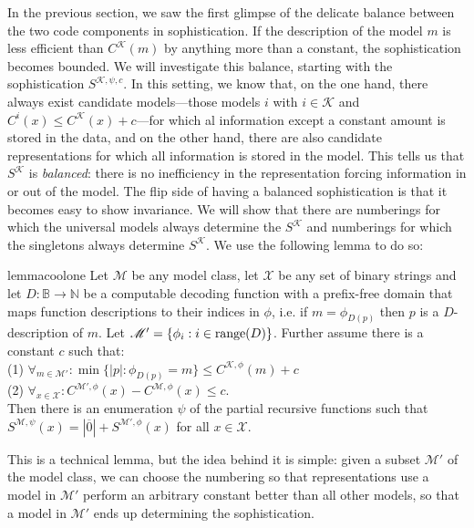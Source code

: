 \documentclass{style/llncs}
\newcommand{\M}{\mathscr M}
\newcommand{\K}{\mathscr K}
\newcommand{\X}{\mathscr X}
\newcommand{\B}{\mathbb B}
\newcommand{\N}{\mathbb N}
\newcommand{\tn}[1]{\textnormal{#1}}
\newcommand{\br}[1]{\overline{#1}}
\begin{document}
In the previous section, we saw the first glimpse of the delicate balance between the two code components in sophistication. If the description of the model $m$ is less efficient than $C^\K(m)$ by anything more than a constant, the sophistication becomes bounded. We will investigate this balance, starting with the sophistication $S^{\K,\psi,c}$. In this setting, we know that, on the one hand, there always exist candidate models---those models $i$ with $i \in \K$ and $C^{i}(x) \leq C^\K(x) + c$---for which al information except a constant amount is stored in the data, and on the other hand, there are also candidate representations for which all information is stored in the model. This tells us that $S^\K$ is \emph{balanced}: there is no inefficiency in the representation forcing information in or out of the model.
The flip side of having a balanced sophistication is that it becomes easy to show invariance. We will show that there are numberings for which the universal models always determine the $S^\K$ and numberings for which the singletons always determine $S^\K$. We use the following lemma to do so:
\begin{restatable}{lemma}{coolone}
\label{lemma:thecoolone}
  Let $\M$ be any model class, let $\X$ be any set of binary strings and let $D:\B\to\N$ be a computable decoding function with a prefix-free domain that maps function descriptions to their indices in $\phi$, i.e. if $m=\phi_{D(p)}$ then $p$ is a $D$-description of $m$. Let $\M'=\{\phi_i:i\in\tn{range}(D)\}$. Further assume there is a constant $c$ such that:\\
\-\hspace{1cm}(1) $\forall_{m\in\M'}:\min\{|p|:\phi_{D(p)}=m\}\le C^{\K,\phi}(m)+c$\\
\-\hspace{1cm}(2) $\forall_{x\in\X}:C^{\M',\phi}(x)-C^{\M,\phi}(x)\le c$.\\
Then there is an enumeration $\psi$ of the partial recursive functions such that $S^{\M,\psi}(x) = |\br{0}|+S^{\M',\phi}(x)$ for all $x\in\X$.
\end{restatable}
This is a technical lemma, but the idea behind it is simple: given a subset $\M'$ of the model class, we can choose the numbering so that representations use a model in $\M'$ perform an arbitrary constant better than all other models, so that a model in $\M'$ ends up determining the sophistication.
\end{document}
